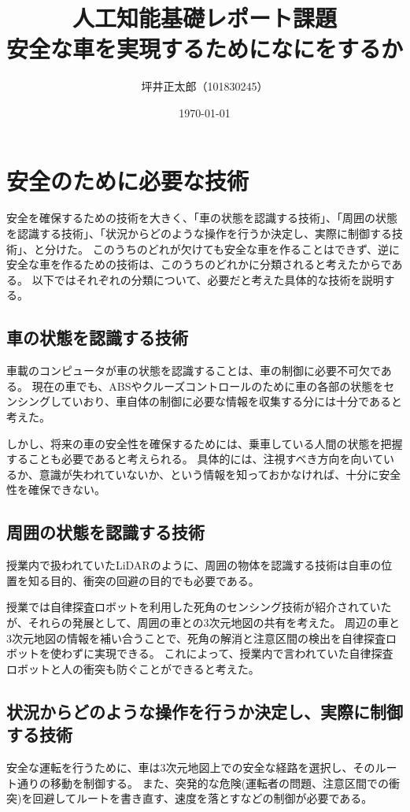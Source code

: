 \documentclass[a4paper,10pt]{jsarticle}
\begin{document}
\title{人工知能基礎レポート課題\\
安全な車を実現するためになにをするか}
\author{坪井正太郎（101830245）}
\date{\today}
\maketitle
\section{安全のために必要な技術}
安全を確保するための技術を大きく、「車の状態を認識する技術」、「周囲の状態を認識する技術」、「状況からどのような操作を行うか決定し、実際に制御する技術」、と分けた。
このうちのどれが欠けても安全な車を作ることはできず、逆に安全な車を作るための技術は、このうちのどれかに分類されると考えたからである。
以下ではそれぞれの分類について、必要だと考えた具体的な技術を説明する。

\subsection{車の状態を認識する技術}
車載のコンピュータが車の状態を認識することは、車の制御に必要不可欠である。
現在の車でも、ABSやクルーズコントロールのために車の各部の状態をセンシングしていおり、車自体の制御に必要な情報を収集する分には十分であると考えた。

しかし、将来の車の安全性を確保するためには、乗車している人間の状態を把握することも必要であると考えられる。
具体的には、注視すべき方向を向いているか、意識が失われていないか、という情報を知っておかなければ、十分に安全性を確保できない。

\subsection{周囲の状態を認識する技術}
授業内で扱われていたLiDARのように、周囲の物体を認識する技術は自車の位置を知る目的、衝突の回避の目的でも必要である。

授業では自律探査ロボットを利用した死角のセンシング技術が紹介されていたが、それらの発展として、周囲の車との3次元地図の共有を考えた。
周辺の車と3次元地図の情報を補い合うことで、死角の解消と注意区間の検出を自律探査ロボットを使わずに実現できる。
これによって、授業内で言われていた自律探査ロボットと人の衝突も防ぐことができると考えた。

\subsection{状況からどのような操作を行うか決定し、実際に制御する技術}
安全な運転を行うために、車は3次元地図上での安全な経路を選択し、そのルート通りの移動を制御する。
また、突発的な危険(運転者の問題、注意区間での衝突)を回避してルートを書き直す、速度を落とすなどの制御が必要である。
\end{document}
